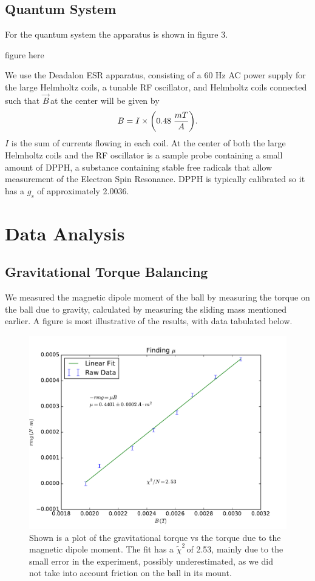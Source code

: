 \documentclass{article}
\newcommand{\redchi}{$\tilde{\chi}^2\,$}
\newcommand{\B}{$\vec{B}\,$}
\begin{document}
	\subsection{Quantum System}
	For the quantum system the apparatus is shown in figure 3.

	figure here

	We use the Deadalon ESR apparatus, consisting of a 60 Hz AC power supply for the large Helmholtz coils, a tunable RF oscillator, and Helmholtz coils connected such that \B at the center will be given by
	\begin{equation*}
		B = I \times \bigg{(}0.48 \hspace{.1cm} \frac{mT}{A}\bigg{)}.
	\end{equation*}
	$I$ is the sum of currents flowing in each coil.  At the center of both the large Helmholtz coils and the RF oscillator is a sample probe containing a small amount of DPPH, a substance containing stable free radicals that allow measurement of the Electron Spin Resonance.  DPPH is typically calibrated so it has a $g_s$ of approximately 2.0036. \cite{DPPH}




\section{Data Analysis}
	\subsection{Gravitational Torque Balancing}
	We measured the magnetic dipole moment of the ball by measuring the torque on the ball due to gravity, calculated by measuring the sliding mass mentioned earlier.  A figure is most illustrative of the results, with data tabulated below.

	\begin{figure}[!htb]
		\centering
		\includegraphics[scale=.5]{../plots/rmgvsmub.pdf}
		\caption{Shown is a plot of the gravitational torque vs the torque due to the magnetic dipole moment.  The fit has a \redchi of 2.53, mainly due to the small error in the experiment, possibly underestimated, as we did not take into account friction on the ball in its mount.}
	\end{figure}
\end{document}
